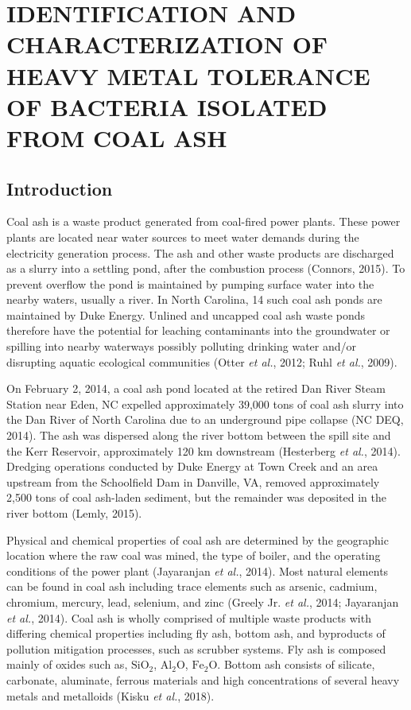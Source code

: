 \documentclass[ms, hidelinks]{uncgdissertationexp}
\theoremstyle{plain}
\theoremstyle{definition}
\theoremstyle{remark}
\begin{document}
\hypertarget{metal}{%
\chapter{IDENTIFICATION AND CHARACTERIZATION OF HEAVY METAL TOLERANCE OF BACTERIA ISOLATED FROM COAL ASH}\label{metal}}

\hypertarget{introduction-1}{%
\section{Introduction}\label{introduction-1}}

Coal ash is a waste product generated from coal-fired power plants. These power plants are located near water sources to meet water demands during the electricity generation process. The ash and other waste products are discharged as a slurry into a settling pond, after the combustion process (Connors, 2015). To prevent overflow the pond is maintained by pumping surface water into the nearby waters, usually a river. In North Carolina, 14 such coal ash ponds are maintained by Duke Energy. Unlined and uncapped coal ash waste ponds therefore have the potential for leaching contaminants into the groundwater or spilling into nearby waterways possibly polluting drinking water and/or disrupting aquatic ecological communities (Otter \emph{et al.}, 2012; Ruhl \emph{et al.}, 2009).

On February 2, 2014, a coal ash pond located at the retired Dan River Steam Station near Eden, NC expelled approximately 39,000 tons of coal ash slurry into the Dan River of North Carolina due to an underground pipe collapse (NC DEQ, 2014). The ash was dispersed along the river bottom between the spill site and the Kerr Reservoir, approximately 120 km downstream (Hesterberg \emph{et al.}, 2014). Dredging operations conducted by Duke Energy at Town Creek and an area upstream from the Schoolfield Dam in Danville, VA, removed approximately 2,500 tons of coal ash-laden sediment, but the remainder was deposited in the river bottom (Lemly, 2015).

Physical and chemical properties of coal ash are determined by the geographic location where the raw coal was mined, the type of boiler, and the operating conditions of the power plant (Jayaranjan \emph{et al.}, 2014). Most natural elements can be found in coal ash including trace elements such as arsenic, cadmium, chromium, mercury, lead, selenium, and zinc (Greely Jr. \emph{et al.}, 2014; Jayaranjan \emph{et al.}, 2014). Coal ash is wholly comprised of multiple waste products with differing chemical properties including fly ash, bottom ash, and byproducts of pollution mitigation processes, such as scrubber systems. Fly ash is composed mainly of oxides such as, \(\mathrm{SiO_2}\), \(\mathrm{Al_2O}\), \(\mathrm{Fe_2O}\). Bottom ash consists of silicate, carbonate, aluminate, ferrous materials and high concentrations of several heavy metals and metalloids (Kisku \emph{et al.}, 2018).
\end{document}
